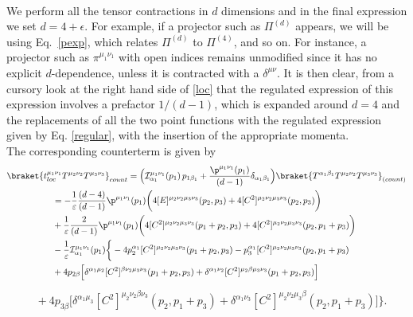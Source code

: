\documentclass[a4paper,11pt,openright,twoside]{book}
\let\a=\alpha   \let\b=\beta   \let\g=\gamma   \let\d=\delta
\numberwithin{equation}{section}
\begin{document}
{{\\ We perform all the tensor contractions in $d$ dimensions and in the final expression we set $d= 4 +\epsilon$. For example, if a projector such as $\Pi^{(d)}$ appears, we will be using Eq.~\eqref{pexp}, which relates $\Pi^{(d)}$ to $\Pi^{(4)}$, and so on. For instance, a projector such as $\pi^{\mu_1\nu_1}$ with open indices remains unmodified since it has no explicit $d$-dependence, unless it is contracted with a $\delta^{\mu\nu}$. It is then clear, from a cursory look at the right hand side of \eqref{loc} that the regulated expression of this expression involves a prefactor $1/(d-1)$, which is expanded around $d=4$ and the replacements of all the two point functions with the regulated expression given by Eq. \eqref{regular}, with the insertion of the appropriate momenta.\\
The corresponding counterterm is given by 
\begin{align}
	\label{locco}
	\braket{t_{loc}^{\mu_1\nu_1}T^{\mu_2\nu_2}T^{\mu_3\nu_3}}_{count}&=\Big(\mathcal{I}^{\mu_1\nu_1}_{\a_1}(p_1)\,p_{1\b_1}+\frac{\p^{\mu_1\nu_1}(p_1)}{(d-1)}\d_{\a_1\b_1}\Big)\braket{T^{\a_1\b_1}T^{\mu_2\nu_2}T^{\mu_3\nu_3}}_{(count)}\notag\\
	&\hspace{-3cm}=-\frac{1}{\varepsilon}\frac{(d-4)}{(d-1)}\p^{\mu_1\nu_1}(p_1)\bigg(4[E]^{\mu_2\nu_2\mu_3\nu_3}(p_2,p_3)+4[C^2]^{\mu_2\nu_2\mu_3\nu_3}(p_2,p_3)\bigg)\notag\\
	&\hspace{-3cm}+\frac{1}{\varepsilon}\frac{2}{(d-1)}\p^{\mu_1\nu_1}(p_1)\bigg(4[C^2]^{\mu_2\nu_2\mu_3\nu_3}(p_1+p_2,p_3)+4[C^2]^{\mu_2\nu_2\mu_3\nu_3}(p_2,p_1+p_3)\bigg)\notag\\
	&\hspace{-3cm}-\frac{1}{\varepsilon}\mathcal{I}^{\mu_1\nu_1}_{\a_1}(p_1)\bigg\{-4p_2^{\a_1}[C^2]^{\mu_2\nu_2\mu_3\nu_3}(p_1+p_2,p_3)-p_3^{\a_1}[C^2]^{\mu_2\nu_2\mu_3\nu_3}(p_2,p_1+p_3)\notag\\
	&\hspace{-3cm}+4p_{2\b}\Big[\d^{\a_1\mu_2}[C^2]^{\b\nu_2\mu_3\nu_3}(p_1+p_2,p_3)+\d^{\a_1\nu_2}[C^2]^{\mu_2\b\mu_3\nu_3}(p_1+p_2,p_3)\Big]\notag\\
\end{align}
\begin{align}
	&\hspace{0cm}+4p_{3\b}\Big[\d^{\a_1\mu_3}[C^2]^{\mu_2\nu_2\b\nu_3}(p_2,p_1+p_3)+\d^{\a_1\nu_3}[C^2]^{\mu_2\nu_2\mu_3\b}(p_2,p_1+p_3)\Big]\bigg\}.
\end{align}
}}
\end{document}
